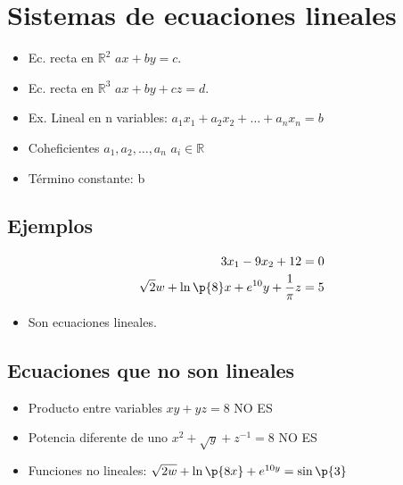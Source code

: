 \section{Sistemas de ecuaciones lineales}
\begin{itemize}
    \item Ec. recta en $\mathbb{R}^2$  $ax+by=c$.
    \item Ec. recta en $\mathbb{R}^3$  $ax+by+cz=d$.
    \item Ex. Lineal en n variables: $a_1x_1+a_2x_2+\dots+a_nx_n=b$ 
    \item Coheficientes $a_1,a_2,\dots,a_n$ $a_i \in \mathbb{R}$ 
    \item Término constante: b
\end{itemize}

\subsection{Ejemplos}
\begin{center}
   \begin{align*}
        3x_1-9x_2+12 = 0 \\ 
        \sqrt{2}w+\ln\p{ 8 } x+e^{10}y+\frac{1}{\pi}z  = 5  \\ 
   \end{align*}
\end{center}
\begin{itemize}
    \item Son ecuaciones lineales. 
\end{itemize}

\subsection{Ecuaciones que no son lineales}
\begin{itemize}
    \item Producto entre variables $xy+yz=8$ NO ES
    \item Potencia diferente de uno $x^2+\sqrt{y}+z^{-1}=8$ NO ES
    \item Funciones no lineales: $\sqrt{2w}+\ln\p{ 8x } +e^{10y} = \sin\p{ 3 } $ 
\end{itemize}

